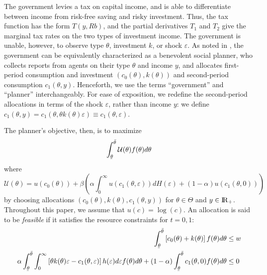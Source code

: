\documentclass[11pt]{article}
\newcommand{\ubar}[1]{\underaccent{\bar}{#1}}
\newcommand{\R}{{\rm I\!R}}
\newcommand{\U}{\mathcal{U}}
\begin{document}
The government levies a tax on capital income, and is able to differentiate between income from risk-free saving and risky investment. Thus, the tax function has the form \( T(y,Rb) \), and the partial derivatives \( T_1 \) and \( T_2 \) give the marginal tax rates on the two types of investment income. The government is unable, however, to observe type \( \theta \), investment \( k \), or shock \( \varepsilon \). As noted in \cite{mirrlees1971exploration}, the government can be equivalently characterized as a benevolent social planner, who collects reports from agents on their type \( \theta \) and income \( y \), and allocates first-period consumption and investment \( \left( c_0(\theta),k(\theta) \right) \) and second-period consumption \( c_1(\theta,y) \). Henceforth, we use the terms ``government'' and ``planner'' interchangeably. For ease of exposition, we redefine the second-period allocations in terms of the shock \( \varepsilon \), rather than income \( y \): we define \( c_1(\theta,y) = c_1(\theta,\theta k\left( \theta \right) \varepsilon) \equiv c_1(\theta, \varepsilon) \).  

The planner's objective, then, is to maximize
\begin{equation}
    \int_{\ubar{\theta}}^{\bar{\theta}}\U(\theta)f(\theta)d\theta \label{plan_obj}
\end{equation}
where 
\begin{equation}
    \U(\theta) = u\left( c_0(\theta) \right) + \beta\left( \alpha\int_{0}^{\infty}u\left( c_1(\theta,\varepsilon) \right)dH(\varepsilon) + (1 - \alpha)u\left( c_1(\theta,0) \right)\right) \label{pkc}
\end{equation}
by choosing allocations \( \left( c_0(\theta),k(\theta) ,c_1(\theta,y) \right)\) for \( \theta\in\Theta \) and \( y\in\R_+ \). Throughout this paper, we assume that \( u(c) = \log(c) \). An allocation is said to be \textit{feasible} if it satisfies the resource constraints for \( t=0,1 \):
\begin{align}
    \int_{\ubar{\theta}}^{\bar{\theta}} \left[ c_0(\theta) + k(\theta) \right]f(\theta)d\theta &\le w \label{rc0} \\
    \alpha\int_{\ubar{\theta}}^{\bar{\theta}}\int_{0}^{\infty}\left[ \theta k(\theta)\varepsilon - c_1(\theta,\varepsilon) \right]h(\varepsilon)d\varepsilon f(\theta)d\theta + (1-\alpha)\int_{\ubar{\theta}}^{\bar{\theta}}c_1(\theta,0)f(\theta)d\theta &\le 0 \label{rc1}
\end{align}
\end{document}

